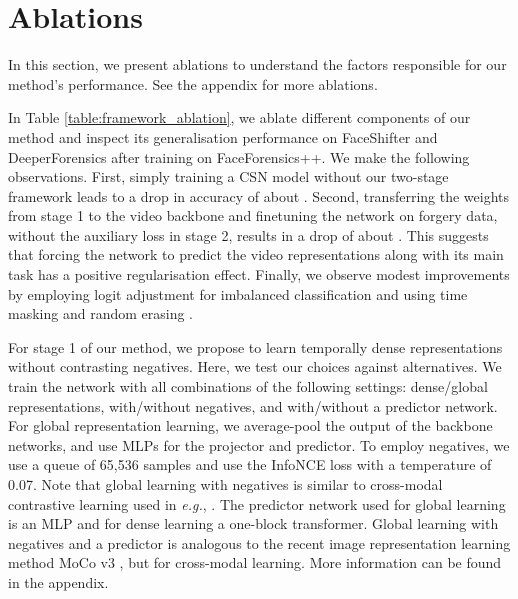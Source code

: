 \documentclass[10pt,twocolumn,letterpaper]{article}
\begin{document}
\section{Ablations} \label{sec:ablations}
In this section, we present ablations to understand the factors responsible for our method's performance. See the appendix for more ablations.

\begin{description}[wide,itemindent=\labelsep]
\item[Framework ablation.] In Table \ref{table:framework_ablation}, we ablate different components of our method and inspect its generalisation performance on FaceShifter and DeeperForensics after training on FaceForensics++. We make the following observations. First, simply training a CSN \cite{tran2019video} model without our two-stage framework leads to a drop in accuracy of about . Second, transferring the weights from stage 1 to the video backbone and finetuning the network on forgery data, without the auxiliary loss in stage 2, results in a drop of about . This suggests that forcing the network to predict the video representations along with its main task has a positive regularisation effect. Finally, we observe modest improvements by employing logit adjustment \cite{menon2020long} for imbalanced classification and using time masking and random erasing \cite{zhong2020random}.

\item[Representation learning ablation.] For stage 1 of our method, we propose to learn temporally dense representations without contrasting negatives. Here, we test our choices against alternatives. We train the network with all combinations of the following settings: dense/global representations, with/without negatives, and with/without a predictor network. For global representation learning, we average-pool the output of the backbone networks, and use MLPs for the projector and predictor. To employ negatives, we use a queue of 65,536 samples and use the InfoNCE loss \cite{oord2018representation} with a temperature of 0.07. Note that global learning with negatives is similar to cross-modal contrastive learning used in \textit{e.g.}, \cite{morgado2021audio, ma2020active}. The predictor network used for global learning is an MLP and for dense learning a one-block transformer. Global learning with negatives and a predictor is analogous to the recent image representation learning method MoCo v3 \cite{chen2021empirical}, but for cross-modal learning. More information can be found in the appendix.


\end{description}
\end{document}
